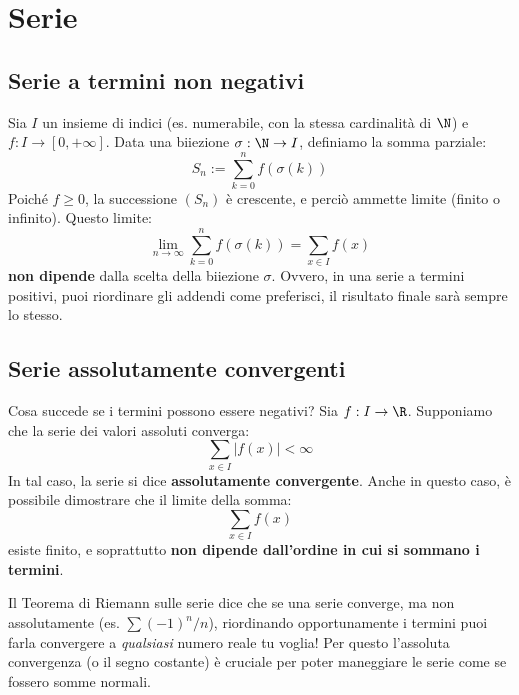 \section{Serie}

\subsection{Serie a termini non negativi}

Sia $I$ un insieme di indici (es. numerabile, con la stessa cardinalità di $\N$) e $f : I \to [0, +\infty]$. Data una biiezione $\sigma : \N \to I$, definiamo la somma parziale:
\[ S_n := \sum_{k=0}^n f(\sigma(k)) \]
Poiché $f \ge 0$, la successione $(S_n)$ è crescente, e perciò ammette limite (finito o infinito). Questo limite:
\[ \lim_{n \to \infty} \sum_{k=0}^n f(\sigma(k)) = \sum_{x \in I} f(x) \]
\textbf{non dipende} dalla scelta della biiezione $\sigma$. Ovvero, in una serie a termini positivi, puoi riordinare gli addendi come preferisci, il risultato finale sarà sempre lo stesso.

\subsection{Serie assolutamente convergenti}

Cosa succede se i termini possono essere negativi? Sia $f : I \to \R$.
Supponiamo che la serie dei valori assoluti converga:
\[ \sum_{x \in I} |f(x)| < \infty \]
In tal caso, la serie si dice \textbf{assolutamente convergente}. Anche in questo caso, è possibile dimostrare che il limite della somma:
\[ \sum_{x \in I} f(x) \]
esiste finito, e soprattutto \textbf{non dipende dall'ordine in cui si sommano i termini}.

\begin{hint}
Il Teorema di Riemann sulle serie dice che se una serie converge, ma non assolutamente (es. $\sum (-1)^n / n$), riordinando opportunamente i termini puoi farla convergere a \emph{qualsiasi} numero reale tu voglia! Per questo l'assoluta convergenza (o il segno costante) è cruciale per poter maneggiare le serie come se fossero somme normali.
\end{hint}

